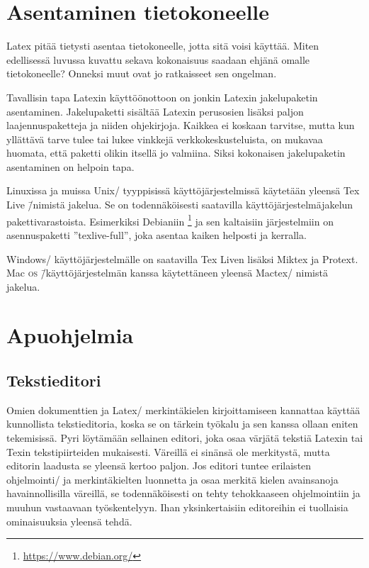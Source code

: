 \section{Asentaminen tietokoneelle}
\label{luku/asentaminen}

Latex pitää tietysti asentaa tietokoneelle, jotta sitä voisi käyttää.
Miten edellisessä luvussa kuvattu sekava kokonaisuus saadaan ehjänä
omalle tietokoneelle? Onneksi muut ovat jo ratkaisseet sen ongelman.

Tavallisin tapa Latexin käyttöönottoon on jonkin Latexin jakelupaketin
asentaminen. Jakelupaketti sisältää Latexin perusosien lisäksi paljon
laajennuspaketteja ja niiden ohjekirjoja. Kaikkea ei koskaan tarvitse,
mutta kun yllättävä tarve tulee tai lukee vinkkejä verkkokeskusteluista,
on mukavaa huomata, että paketti olikin itsellä jo valmiina. Siksi
kokonaisen jakelupaketin asentaminen on helpoin tapa.

Linuxissa ja muissa Unix\-/ tyyppisissä käyttöjärjestelmissä käytetään
yleensä Tex Live \=/nimistä jakelua. Se on todennäköisesti saatavilla
käyttöjärjestelmäjakelun pakettivarastoista. Esimerkiksi Debianiin%
\footnote{\url{https://www.debian.org/}} ja sen kaltaisiin järjestelmiin
on asennuspaketti ''texlive-full'', joka asentaa kaiken helposti ja
kerralla.

Windows\-/ käyttöjärjestelmälle on saatavilla Tex Liven lisäksi Miktex
ja Protext. Mac \textsc{os} \=/käyttöjärjestelmän kanssa käytettäneen
yleensä Mactex\-/ nimistä jakelua.

\section{Apuohjelmia}

\subsection{Tekstieditori}

Omien dokumenttien ja Latex\-/ merkintäkielen kirjoittamiseen kannattaa
käyttää kunnollista tekstieditoria, koska se on tärkein työkalu ja sen
kanssa ollaan eniten tekemisissä. Pyri löytämään sellainen editori, joka
osaa värjätä tekstiä Latexin tai Texin tekstipiirteiden mukaisesti.
Väreillä ei sinänsä ole merkitystä, mutta editorin laadusta se yleensä
kertoo paljon. Jos editori tuntee erilaisten ohjelmointi\-/{} ja
merkintäkielten luonnetta ja osaa merkitä kielen avainsanoja
havainnollisilla väreillä, se todennäköisesti on tehty tehokkaaseen
ohjelmointiin ja muuhun vastaavaan työskentelyyn. Ihan yksinkertaisiin
editoreihin ei tuollaisia ominaisuuksia yleensä tehdä.

